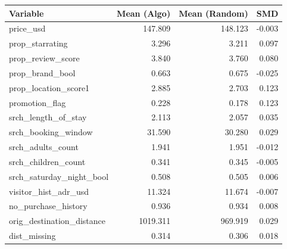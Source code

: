 \begin{table}[!h]
\centering
\begin{tabular}{lrrr}
\toprule
Variable & Mean (Algo) & Mean (Random) & SMD\\
\midrule
price\_usd & 147.809 & 148.123 & -0.003\\
prop\_starrating & 3.296 & 3.211 & 0.097\\
prop\_review\_score & 3.840 & 3.760 & 0.080\\
prop\_brand\_bool & 0.663 & 0.675 & -0.025\\
prop\_location\_score1 & 2.885 & 2.703 & 0.123\\
promotion\_flag & 0.228 & 0.178 & 0.123\\
srch\_length\_of\_stay & 2.113 & 2.057 & 0.035\\
srch\_booking\_window & 31.590 & 30.280 & 0.029\\
srch\_adults\_count & 1.941 & 1.951 & -0.012\\
srch\_children\_count & 0.341 & 0.345 & -0.005\\
srch\_saturday\_night\_bool & 0.508 & 0.505 & 0.006\\
visitor\_hist\_adr\_usd & 11.324 & 11.674 & -0.007\\
no\_purchase\_history & 0.936 & 0.934 & 0.008\\
orig\_destination\_distance & 1019.311 & 969.919 & 0.029\\
dist\_missing & 0.314 & 0.306 & 0.018\\
\bottomrule
\end{tabular}
\end{table}
